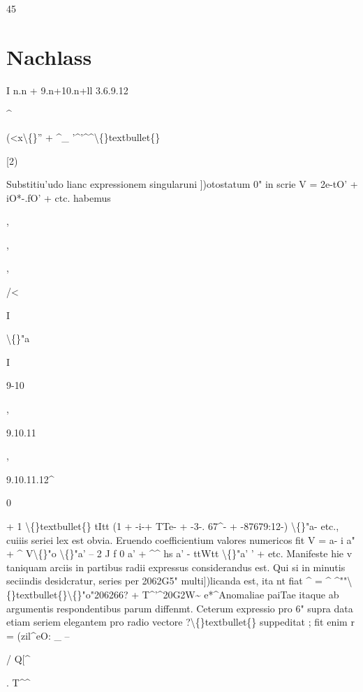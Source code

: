 \documentclass[10pt,a4paper]{article}
\begin{document}
45

\newpage

\section*{Nachlass}

I n.n + 9.n+10.n+ll
3.6.9.12

\textasciicircum{}

(<x\textbackslash\{\}'' + \textasciicircum{}\_
'\textasciicircum{}'\textasciicircum{}\textasciicircum{}\textbackslash\{\}textbullet\{\}

[2)

Substitiu'udo lianc expressionem singularuni ])otostatum 0" in scrie
V = 2e-tO' + iO*-.fO' + ctc.
habemus

,

,

,

/<

I

\textbackslash\{\}"a

I

9-10

,

9.10.11

,

9.10.11.12\textasciicircum{}

0

+ 1 \textbackslash\{\}textbullet\{\} tItt (1 + -i-+ TTe- + -3-. 67\textasciicircum{}- + -87679:12-) \textbackslash\{\}"a- etc.,
cuiiis seriei lex est obvia.
Eruendo coefficientium valores numericos fit
V = a- i a" + \textasciicircum{} V\textbackslash\{\}"o \textbackslash\{\}"a' -- 2 J f 0 a' + \textasciicircum{}\textasciicircum{} hs a' - ttWtt \textbackslash\{\}"a' ' + etc.
Manifeste hie v taniquam arciis in partibus radii expressus considerandus
est. Qui si in minutis seciindis desidcratur, series per 2062G5" multi])licanda
est, ita nt fiat
\textasciicircum{} = \textasciicircum{} \textasciicircum{}""\textbackslash\{\}textbullet\{\}\textbackslash\{\}"o"206266? + T\textasciicircum{}'\textasciicircum{}20G2W\textasciitilde{} e*\textasciicircum{}Anomaliae paiTae itaque ab argumentis respondentibus parum diffenmt.
Ceterum expressio pro 6" supra data etiam seriem elegantem pro radio
vectore ?\textbackslash\{\}textbullet\{\} suppeditat ; fit enim
r = (zil\textasciicircum{}eO:
\_
--

/
Q[\textasciicircum{}

. T\textasciicircum{}\textasciicircum{}
\end{document}
